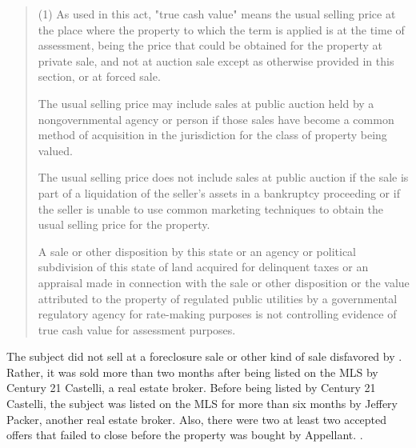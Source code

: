 \documentclass[12pt,\documentclassflag]{michiganCourtOfAppealsBrief}
\begin{document}
\begin{quotation}
  (1) As used in this act, "true cash value" means the usual selling price at the place where the property to which the term is applied is at the time of assessment, being the price that could be obtained for the property at private sale, and not at auction sale except as otherwise provided in this section, or at forced sale.

  The usual selling price may include sales at public auction held by a nongovernmental agency or person if those sales have become a common method of acquisition in the jurisdiction for the class of property being valued.

  The usual selling price does not include sales at public auction if the sale is part of a liquidation of the seller's assets in a bankruptcy proceeding or if the seller is unable to use common marketing techniques to obtain the usual selling price for the property.

  A sale or other disposition by this state or an agency or political subdivision of this state of land acquired for delinquent taxes or an appraisal made in connection with the sale or other disposition or the value attributed to the property of regulated public utilities by a governmental regulatory agency for rate-making purposes is not controlling evidence of true cash value for assessment purposes.

\end{quotation}

 The subject did not sell at a foreclosure sale or other kind of sale disfavored by \cite[s]{MCL 211.27(1)}. Rather, it was sold more than two months after being listed on the MLS by Century 21 Castelli, a real estate broker. Before being listed by Century 21 Castelli, the subject was listed on the MLS for more than six months by Jeffery Packer, another real estate broker. Also, there were two at least two accepted offers that failed to close before the property was bought by Appellant. \mlsHistory.
\end{document}
